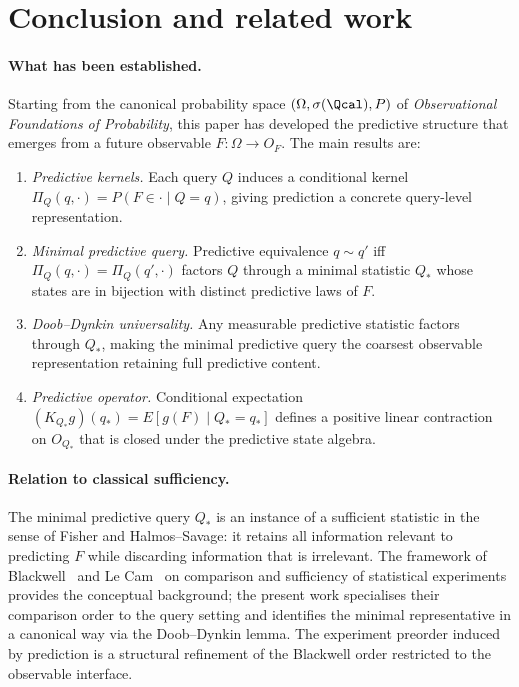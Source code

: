 \section{Conclusion and related work}

\paragraph{What has been established.}
Starting from the canonical probability space $(\Omega,\sigma(\Qcal),P)$
of \emph{Observational Foundations of Probability}, this paper has
developed the predictive structure that emerges from a future observable
$F:\Omega\to O_F$.  The main results are:

\begin{enumerate}
  \item \emph{Predictive kernels.}  Each query $Q$ induces a
    conditional kernel $\Pi_Q(q,\cdot) = P(F\in\cdot\mid Q=q)$, giving
    prediction a concrete query-level representation.
  \item \emph{Minimal predictive query.}  Predictive equivalence $q\sim q'$
    iff $\Pi_Q(q,\cdot)=\Pi_Q(q',\cdot)$ factors $Q$ through a minimal
    statistic $Q_*$ whose states are in bijection with distinct predictive
    laws of $F$.
  \item \emph{Doob--Dynkin universality.}  Any measurable predictive
    statistic factors through $Q_*$, making the minimal predictive query
    the coarsest observable representation retaining full predictive
    content.
  \item \emph{Predictive operator.}  Conditional expectation
    $(K_{Q_*}g)(q_*) = E[g(F)\mid Q_*=q_*]$ defines a positive linear
    contraction on $O_{Q_*}$ that is closed under the predictive state
    algebra.
\end{enumerate}

\paragraph{Relation to classical sufficiency.}
The minimal predictive query $Q_*$ is an instance of a sufficient
statistic in the sense of Fisher and Halmos--Savage: it retains all
information relevant to predicting $F$ while discarding information
that is irrelevant.  The framework of Blackwell~\cite{Blackwell} and
Le Cam~\cite{LeCam} on comparison and sufficiency of statistical
experiments provides the conceptual background; the present work
specialises their comparison order to the query setting and identifies
the minimal representative in a canonical way via the Doob--Dynkin
lemma.  The experiment preorder induced by prediction is a structural
refinement of the Blackwell order restricted to the observable interface.

